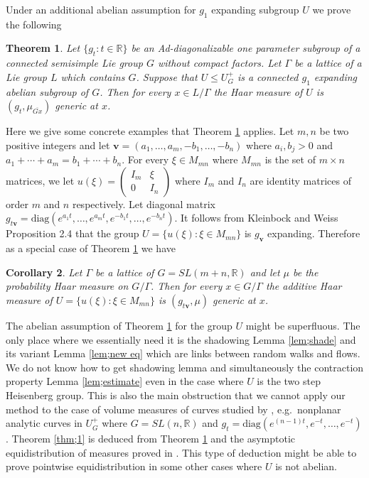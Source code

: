 \documentclass[12pt]{amsart}
\newtheorem{thm}{Theorem}[section]
\newtheorem{cor}[thm]{Corollary}
\theoremstyle{definition}
\theoremstyle{remark}
\numberwithin{equation}{section}
\begin{document}
 
 Under an additional abelian assumption for $g_1$ expanding  subgroup  $U$ we  prove the following 
\begin{thm}\label{thm;2}
Let  $\{g_t :t\in \mathbb R\}$ be an  Ad-diagonalizable
one parameter subgroup of a connected semisimple Lie group  $G$ without compact factors.
Let $\Gamma$ be a lattice of a Lie group  $L$ which
contains $G$.  
Suppose that  $U\le U_G^+$ is a connected  $ g_1 $ expanding abelian  subgroup of $G$.
Then for every  $x\in L/\Gamma$   the  Haar measure of $U$ is 
 $(g_t, \mu_{\overline {Gx}})$ generic at $x$.
\end{thm}

Here we give some concrete examples that Theorem \ref{thm;2} applies. Let $m,n$
be two positive integers and let $\mathbf v=(a_1, \ldots, a_m, -b_1, \ldots,- b_n)$
where $a_i, b_j>0$ and $a_1+\cdots+ a_m=b_1+\cdots+b_n$. 
For every $\xi\in M_{mn}$ where  $ M_{mn}$ is the set   of $m\times n$
matrices, we let 
$u(\xi)=\left(
\begin{array}{cc}
I_m  & \xi\\
0    & I_n
\end{array}
\right)$
where $I_m$ and $I_n$ are identity matrices of order $m$ and $n$ respectively.
Let  diagonal matrix  $g_{t\mathbf v}=\mathrm{diag}(e^{a_1t}, \ldots, e^{a_mt}, e^{-b_1t},\ldots, e^{-b_nt})$. 
It follows from Kleinbock and Weiss \cite{kw08} Proposition 2.4 that the group
$U=\{u(\xi): \xi\in M_{mn}\}$ is $g_{\mathbf v}$ expanding. Therefore as a special case 
of Theorem \ref{thm;2} we have 
\begin{cor}
Let $\Gamma$ be a lattice of $G=SL(m+n, \mathbb R)$ and let $\mu$
be the probability Haar measure on $G/\Gamma$. Then for every $x\in G/\Gamma$ the 
additive Haar measure of $U=\{u(\xi): \xi\in M_{mn}\}$ is $(g_{t\mathbf v}, \mu)$
generic at $x$.
\end{cor}

The abelian assumption of Theorem \ref{thm;2} for the group $U$ might be superfluous. 
The only place where we essentially need  it is the shadowing Lemma \ref{lem;shade} and its variant
Lemma \ref{lem;new eq} which 
are links between random walks and flows. 
We do not know how to get shadowing lemma and  simultaneously the  contraction property
Lemma \ref{lem;estimate} 
 even in the case where $U$ is the two step  Heisenberg group. 
 This is also the main obstruction that  we cannot apply our method 
 to  the case of volume measures of  curves studied by  \cite{s09}\cite{s092}\cite{s093}\cite{s10}, 
e.g.~nonplanar analytic  curves
 in $U_G^+$ where $G=SL(n, \mathbb R)$ and $g_t=\mbox{diag}(e^{(n-1)t}, e^{-t},\ldots, e^{-t})$. 
Theorem \ref{thm;1} is deduced from Theorem \ref{thm;2} and the asymptotic  equidistribution of measures
proved in  \cite{sw96}. 
This type of deduction  might  be able to  prove pointwise equidistribution in some 
other cases where $U$ is not abelian.
\end{document}
